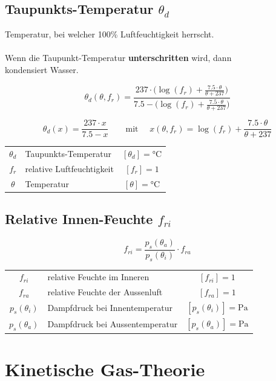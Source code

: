 \subsection{Taupunkts-Temperatur $\theta_d$}
Temperatur, bei welcher 100\% Luftfeuchtigkeit herrscht. \\
\\
Wenn die Taupunkt-Temperatur \textbf{unterschritten} wird, dann \\
kondensiert Wasser.

$$ \boxed{ \theta_d (\theta, f_r) = \frac{237 \cdot \Big( \log(f_r) + \frac{7.5 \cdot \theta}{\theta + 237}    \Big)}{7.5 - \Big( \log(f_r) + \frac{7.5 \cdot \theta }{\theta + 237} \Big) }  }$$


$$ \boxed{ \theta_d (x) = \frac{237 \cdot x}{7.5 - x}    \qquad  \text{mit } \quad    x(\theta, f_r) = \log(f_r) + \frac{7.5 \cdot \theta}{\theta + 237}  }   $$


\begin{tabular}{c l c}
	$\theta_d$ & Taupunkts-Temperatur & $[\theta_d] = \text{°C}$ \\
	$f_r$ & relative Luftfeuchtigkeit & $[f_r] = 1$ \\
	$\theta$ & Temperatur & $[\theta] = \text{°C}$ \\
\end{tabular}




\subsection{Relative Innen-Feuchte $f_{ri}$}

$$ \boxed{ f_{ri} = \frac{p_s(\theta_a)}{p_s(\theta_i)} \cdot f_{ra}  }$$

\begin{tabular}{c l c}
	$f_{ri}$ & relative Feuchte im Inneren & $[f_{ri}] = 1$ \\
	$f_{ra}$ & relative Feuchte der Aussenluft & $[f_{ra}] = \text{1}$ \\
	$p_s(\theta_i)$ & Dampfdruck bei Innentemperatur & $[p_s(\theta_i)] = \mathrm{Pa}$ \\
	$p_s(\theta_a)$ & Dampfdruck bei Aussentemperatur &  $[p_s(\theta_a)] = \mathrm{Pa}$  \\
\end{tabular}





\section{Kinetische Gas-Theorie} %

